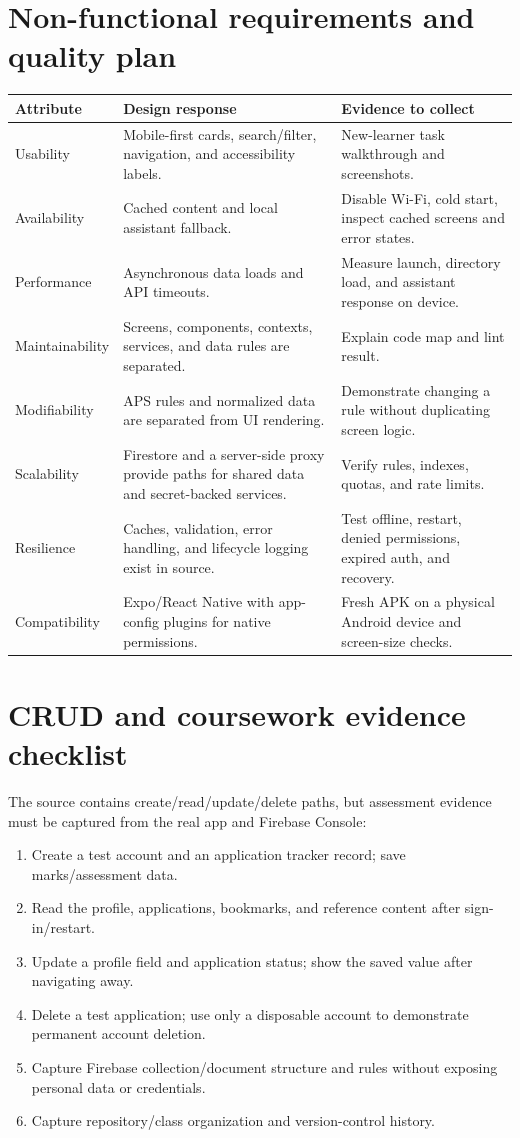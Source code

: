 \documentclass[11pt,a4paper]{article}
\begin{document}
\section{Non-functional requirements and quality plan}
\begin{longtable}{p{}p{}p{}}
\toprule
\textbf{Attribute} & \textbf{Design response} & \textbf{Evidence to collect}\\
\midrule
Usability & Mobile-first cards, search/filter, navigation, and accessibility labels. & New-learner task walkthrough and screenshots.\\
Availability & Cached content and local assistant fallback. & Disable Wi-Fi, cold start, inspect cached screens and error states.\\
Performance & Asynchronous data loads and API timeouts. & Measure launch, directory load, and assistant response on device.\\
Maintainability & Screens, components, contexts, services, and data rules are separated. & Explain code map and lint result.\\
Modifiability & APS rules and normalized data are separated from UI rendering. & Demonstrate changing a rule without duplicating screen logic.\\
Scalability & Firestore and a server-side proxy provide paths for shared data and secret-backed services. & Verify rules, indexes, quotas, and rate limits.\\
Resilience & Caches, validation, error handling, and lifecycle logging exist in source. & Test offline, restart, denied permissions, expired auth, and recovery.\\
Compatibility & Expo/React Native with app-config plugins for native permissions. & Fresh APK on a physical Android device and screen-size checks.\\
\bottomrule
\end{longtable}

\section{CRUD and coursework evidence checklist}
The source contains create/read/update/delete paths, but assessment evidence must be captured from the real app and Firebase Console:
\begin{enumerate}
\item Create a test account and an application tracker record; save marks/assessment data.
\item Read the profile, applications, bookmarks, and reference content after sign-in/restart.
\item Update a profile field and application status; show the saved value after navigating away.
\item Delete a test application; use only a disposable account to demonstrate permanent account deletion.
\item Capture Firebase collection/document structure and rules without exposing personal data or credentials.
\item Capture repository/class organization and version-control history.
\end{enumerate}
\end{document}
